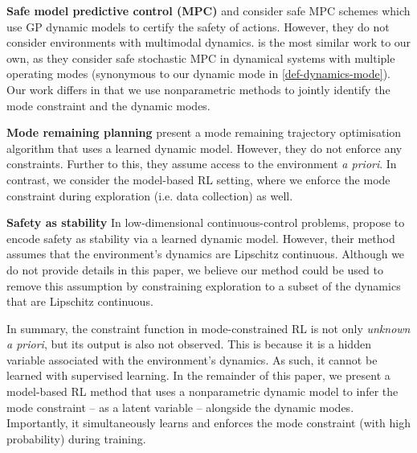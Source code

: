 \documentclass[twoside]{article}
\begin{document}
\textbf{Safe model predictive control (MPC)}
\cite{kollerLearningBased2018} and \cite{hewingLearningBased2020} consider safe MPC schemes which use GP dynamic models to
certify the safety of actions.
However, they do not consider environments with multimodal dynamics.
\cite{arcariDualStochasticMPC2020} is the most similar work to our own, as they consider safe stochastic MPC in dynamical systems with multiple
operating modes (synonymous to our dynamic mode in \cref{def-dynamics-mode}).
Our work differs in that we use nonparametric methods to jointly identify the mode constraint and the dynamic modes.


\textbf{Mode remaining planning}
\cite{scannellTrajectory2021} present a mode remaining trajectory optimisation algorithm that uses a learned dynamic model.
However, they do not enforce any constraints.
Further to this, they assume access to the environment \emph{a priori}.
In contrast, we consider the model-based RL setting, where we enforce the mode constraint during exploration (i.e. data collection) as well.


\textbf{Safety as stability}
In low-dimensional continuous-control problems, \cite{berkenkampSafe2017} propose to encode safety as stability via a learned dynamic model.
However, their method assumes that the environment's dynamics are Lipschitz continuous.
Although we do not provide details in this paper, we believe our method could be used to remove this assumption by constraining exploration to a subset
of the dynamics that are Lipschitz continuous.


In summary, the constraint function in mode-constrained RL is not only \emph{unknown a priori}, but its output is also not observed.
This is because it is a hidden variable associated with the environment's dynamics.
As such, it cannot be learned with supervised learning.
In the remainder of this paper, we present a model-based RL method that uses a nonparametric dynamic model to infer the mode constraint -- as a latent variable --
alongside the dynamic modes.
Importantly, it simultaneously learns and enforces the mode constraint (with high probability) during training.
\end{document}
